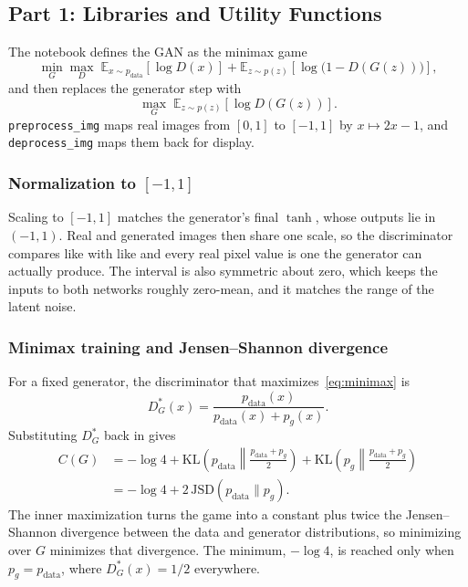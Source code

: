 \subsection{Part 1: Libraries and Utility Functions}

The notebook defines the GAN as the minimax game
\begin{equation}
  \min_G \max_D \;
  \mathbb{E}_{x \sim p_{\mathrm{data}}}\!\left[\log D(x)\right]
  + \mathbb{E}_{z \sim p(z)}\!\left[\log \bigl(1 - D(G(z))\bigr)\right],
  \label{eq:minimax}
\end{equation}
and then replaces the generator step with
\begin{equation}
  \max_G \; \mathbb{E}_{z \sim p(z)}\!\left[\log D(G(z))\right].
  \label{eq:nonsat}
\end{equation}
\texttt{preprocess\_img} maps real images from \([0,1]\) to \([-1,1]\) by \(x \mapsto 2x-1\), and \texttt{deprocess\_img} maps them back for display.

\subsubsection{Normalization to \([-1,1]\)}

Scaling to \([-1,1]\) matches the generator's final \(\tanh\), whose outputs lie in \((-1,1)\). Real and generated images then share one scale, so the discriminator compares like with like and every real pixel value is one the generator can actually produce. The interval is also symmetric about zero, which keeps the inputs to both networks roughly zero-mean, and it matches the range of the latent noise.

\subsubsection{Minimax training and Jensen--Shannon divergence}

For a fixed generator, the discriminator that maximizes~\eqref{eq:minimax} is
\begin{equation}
  D_G^*(x) = \frac{p_{\mathrm{data}}(x)}{p_{\mathrm{data}}(x) + p_g(x)}.
\end{equation}
Substituting \(D_G^*\) back in gives
\begin{align}
  C(G)
  &= -\log 4
    + \mathrm{KL}\!\left(p_{\mathrm{data}} \middle\| \frac{p_{\mathrm{data}}+p_g}{2}\right)
    + \mathrm{KL}\!\left(p_g \middle\| \frac{p_{\mathrm{data}}+p_g}{2}\right) \nonumber \\
  &= -\log 4 + 2\,\mathrm{JSD}(p_{\mathrm{data}} \| p_g).
  \label{eq:jsd}
\end{align}
The inner maximization turns the game into a constant plus twice the Jensen--Shannon divergence between the data and generator distributions, so minimizing over \(G\) minimizes that divergence. The minimum, \(-\log 4\), is reached only when \(p_g = p_{\mathrm{data}}\), where \(D_G^*(x) = 1/2\) everywhere.

